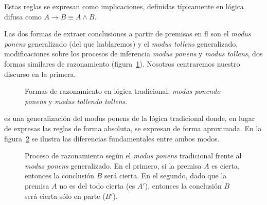 
Estas reglas se expresan como implicaciones, definidas típicamente en lógica difusa como $A \rightarrow B \equiv A \land B$.

Las dos formas de extraer conclusiones a partir de premisas en \gls{fl} son el \textit{modus ponens} generalizado (del que hablaremos) y el \textit{modus tollens} generalizado, modificaciones sobre los procesos de inferencia \textit{modus ponens} y \textit{modus tollens}, dos formas similares de razonamiento (figura~\ref{fig:modus-ponens-and-modus-tollens}). Nosotros centraremos nuestro discurso en la primera.

\begin{figure}
	\caption[\textit{Modus ponendo ponens} vs. \textit{modus tollendo tollens}]{Formas de razonamiento en lógica tradicional: \textit{modus ponendo ponens} y \textit{modus tollendo tollens}.}
	\label{fig:modus-ponens-and-modus-tollens}
\end{figure}

 es una generalización del modus ponens de la lógica tradicional donde, en lugar de expresas las reglas de forma absoluta, se expresan de forma aproximada. En la figura~\ref{fig:modus-ponens-traditional-vs-generalized} se ilustra las diferencias fundamentales entre ambos modos.

\begin{figure}
	\caption[Diferencias entre \textit{modus ponens} tradicional y generalizado]{Proceso de razonamiento según el \textit{modus ponens} tradicional frente al \textit{modus ponens} generalizado. En el primero, si la premisa $A$ es cierta, entonces la conclusión $B$ será cierta. En el segundo, dado que la premisa $A$ no es del todo cierta (es $A'$), entonces la conclusión $B$ será cierta sólo en parte ($B'$).}
	\label{fig:modus-ponens-traditional-vs-generalized}
\end{figure}


